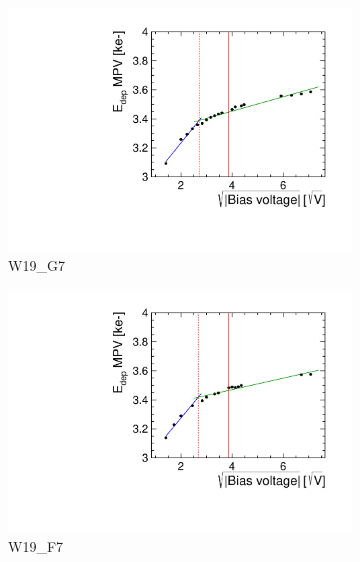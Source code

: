\begin{figure}[htbp] \centering
  \begin{subfigure}[b]{0.33\textwidth}
    \includegraphics[width=\textwidth]{./figures/TestBeam/depletionVoltage_W0019_G07_Edep.pdf}
    \caption{W19\_G7}
  \end{subfigure} \hfill
  \begin{subfigure}[b]{0.33\textwidth}
    \includegraphics[width=\textwidth]{./figures/TestBeam/depletionVoltage_W0019_F07_Edep.pdf}
    \caption{W19\_F7}
  \end{subfigure}\hfill
  \begin{subfigure}[b]{0.33\textwidth}

\end{subfigure}
\end{figure}
